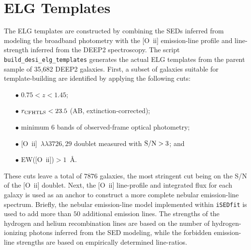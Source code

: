 \documentclass[12pt]{article}
\newcommand{\oii}{[O~{\sc ii}]}
\newcommand{\oiilam}{[O~{\sc ii}]~\ensuremath{\lambda\lambda3726,29}}
\begin{document}
\section{ELG Templates}



The ELG templates are constructed by combining the SEDs inferred from
modeling the broadband photometry with the \oii{} emission-line
profile and line-strength inferred from the DEEP2 spectroscopy.  The
script {\tt build\_desi\_elg\_templates} generates the actual ELG
templates from the parent sample of 35,682 DEEP2 galaxies.  First, a
subset of galaxies suitable for template-building are identified by
applying the following cuts:

\begin{enumerate}
\item[$\bullet$]{$0.75<z<1.45$;}
\item[$\bullet$]{$r_{\rm CFHTLS}<23.5$ (AB, extinction-corrected);}
\item[$\bullet$]{minimum 6 bands of observed-frame optical photometry;}
\item[$\bullet$]{\oiilam{} doublet measured with ${\rm S/N}>3$; and}
\item[$\bullet$]{EW(\oii)$>1$~\AA.}
\end{enumerate}

These cuts leave a total of $7876$ galaxies, the most stringent cut
being on the S/N of the \oii{} doublet.  Next, the \oii{} line-profile
and integrated flux for each galaxy is used as an anchor to construct
a more complete nebular emission-line spectrum.  Briefly, the nebular
emission-line model implemented within {\tt iSEDfit} is used to add
more than $50$ additional emission lines.  The strengths of the
hydrogen and helium recombination lines are based on the number of
hydrogen-ionizing photons inferred from the SED modeling, while the
forbidden emission-line strengths are based on empirically determined
line-ratios.
\end{document}
